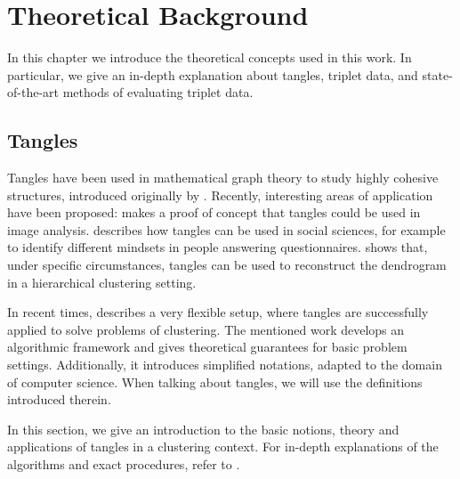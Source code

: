 \chapter{Theoretical Background}\label{theory}
In this chapter we introduce the theoretical concepts used in this work. 
In particular, we give an in-depth explanation about tangles, triplet data, and state-of-the-art methods of evaluating triplet data.

\section{Tangles}\label{theory:tangles}
Tangles have been used in mathematical graph theory to study highly cohesive structures, 
introduced originally by \cite{robertsonGraphMinorsObstructions1991}. 
Recently, interesting areas of application have been proposed:
\cite{diestelTanglesMonaLisa2017} makes a proof of concept that tangles could 
be used in image analysis.
\cite{diestelTanglesSocialSciences2019} describes how tangles can be used in social sciences, for 
example to identify different mindsets in people answering questionnaires.
\cite{Fluck2019} shows that, under specific circumstances, tangles can be
used to reconstruct the dendrogram in a hierarchical clustering setting. 

In recent times, \cite{klepperClusteringTanglesAlgorithmic2021} describes a very flexible setup,
where tangles are successfully applied to solve problems of clustering. 
The mentioned work develops an algorithmic framework and gives theoretical guarantees for 
basic problem settings.
Additionally, it introduces simplified notations, adapted to the domain of computer science. 
When talking about tangles, we will use the definitions introduced therein. 

In this section, we give an introduction to the basic notions, theory and applications of tangles in a clustering context.
For in-depth explanations of the algorithms and exact procedures, refer to 
\cite{klepperClusteringTanglesAlgorithmic2021}.


